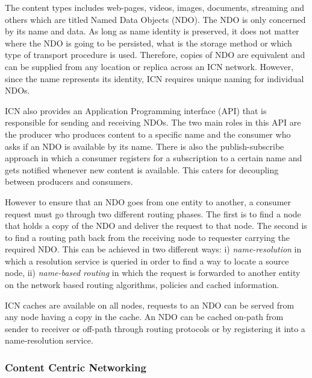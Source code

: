 The content types includes web-pages, videos, images, documents, streaming and others which are titled Named Data Objects (NDO). The NDO is only concerned by its name and data. As long as name identity is preserved, it does not matter where the NDO is going to be persisted, what is the storage method or which type of transport procedure is used. Therefore, copies of NDO are equivalent and can be supplied from any location or replica across an ICN network. However, since the name represents its identity, ICN requires unique naming for individual NDOs.

ICN also provides an Application Programming interface (API) that is responsible for sending and receiving NDOs. The two main roles in this API are the producer who produces content to a specific name and the consumer who asks if an NDO is available by its name. There is also the publish-subscribe approach in which a consumer registers for a subscription to a certain name and gets notified whenever new content is available. This caters for  decoupling between producers and consumers. 

However to ensure that an NDO goes from one entity to another, a consumer request must go through two different routing phases. The first is to find a node that holds a copy of the  NDO
and deliver the request to that node. The second is to find a routing path back from the receiving node to requester carrying the required NDO. This can be achieved in two different ways: i) \textit{name-resolution} in which a resolution service is queried in order to find a way to locate a source node, ii) \textit{name-based routing} in which the request is forwarded to	 another entity on the network based routing algorithms, policies and cached information.

ICN caches are available on all nodes, requests to an NDO can be served from any node having a copy in the cache. An NDO can be cached on-path from sender to receiver or off-path through routing protocols or by registering it into a name-resolution service\cite{6231276}.


\subsubsection{Content Centric Networking}

